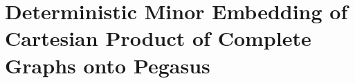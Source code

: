 
\chapter{Deterministic Minor Embedding of Cartesian Product of Complete Graphs onto Pegasus}
\label{ch:PegasusCPCG}